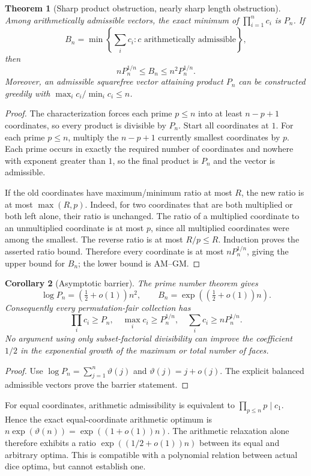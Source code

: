 \documentclass[11pt]{article}
\newtheorem{theorem}{Theorem}
\newtheorem{corollary}[theorem]{Corollary}
\begin{document}
\begin{theorem}[Sharp product obstruction, nearly sharp length obstruction]
Among arithmetically admissible vectors, the exact minimum of
$\prod_{i=1}^n c_i$ is $P_n$. If
\[
 B_n=\min\left\{\sum_i c_i:c\text{ arithmetically admissible}\right\},
\]
then
\[
 nP_n^{1/n}\le B_n\le n^2P_n^{1/n}.
\]
Moreover, an admissible squarefree vector attaining product $P_n$ can be
constructed greedily with $\max_i c_i/\min_i c_i\le n$.
\end{theorem}
\begin{proof}
The characterization forces each prime $p\le n$ into at least $n-p+1$
coordinates, so every product is divisible by $P_n$.
Start all coordinates at $1$. For each prime $p\le n$, multiply the
$n-p+1$ currently smallest coordinates by $p$. Each prime occurs in
exactly the required number of coordinates and nowhere with exponent
greater than $1$, so the final product is $P_n$ and the vector is
admissible.

If the old coordinates have maximum/minimum ratio at most $R$,
the new ratio is at most $\max(R,p)$. Indeed, for two coordinates that
are both multiplied or both left alone, their ratio is unchanged. The
ratio of a multiplied coordinate to an unmultiplied coordinate is at
most $p$, since all multiplied coordinates were among the smallest.
The reverse ratio is at most $R/p\le R$.
Induction proves the asserted ratio bound. Therefore every coordinate is
at most $nP_n^{1/n}$, giving the upper bound for $B_n$; the lower bound
is AM--GM.
\end{proof}

\begin{corollary}[Asymptotic barrier]
The prime number theorem gives
\[
 \log P_n=\left(\tfrac12+o(1)\right)n^2,
 \qquad
 B_n=\exp\left(\left(\tfrac12+o(1)\right)n\right).
\]
Consequently every permutation-fair collection has
\[
 \prod_i c_i\ge P_n,
 \quad\max_i c_i\ge P_n^{1/n},
 \quad\sum_i c_i\ge nP_n^{1/n}.
\]
No argument using only subset-factorial divisibility can improve the
coefficient $1/2$ in the exponential growth of the maximum or total
number of faces.
\end{corollary}
\begin{proof}
Use $\log P_n=\sum_{j=1}^n\vartheta(j)$ and
$\vartheta(j)=j+o(j)$. The explicit balanced admissible vectors prove
the barrier statement.
\end{proof}

For equal coordinates, arithmetic admissibility is equivalent to
$\prod_{p\le n}p\mid c_1$. Hence the exact equal-coordinate arithmetic
optimum is $n\exp(\vartheta(n))=\exp((1+o(1))n)$.
The arithmetic relaxation alone therefore exhibits a ratio
$\exp((1/2+o(1))n)$ between its equal and arbitrary optima. This is
compatible with a polynomial relation between actual dice optima,
but cannot establish one.
\end{document}
